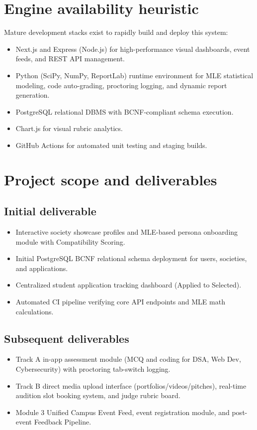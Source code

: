 \documentclass[11pt,a4paper]{article}
\begin{document}
\section{Engine availability heuristic}
Mature development stacks exist to rapidly build and deploy this system:
\begin{itemize}[leftmargin=0.7cm]
    \item Next.js and Express (Node.js) for high-performance visual dashboards, event feeds, and REST API management.
    \item Python (SciPy, NumPy, ReportLab) runtime environment for MLE statistical modeling, code auto-grading, proctoring logging, and dynamic report generation.
    \item PostgreSQL relational DBMS with BCNF-compliant schema execution.
    \item Chart.js for visual rubric analytics.
    \item GitHub Actions for automated unit testing and staging builds.
\end{itemize}

\section{Project scope and deliverables}
\subsection{Initial deliverable}
\begin{itemize}[leftmargin=0.7cm]
    \item Interactive society showcase profiles and MLE-based persona onboarding module with Compatibility Scoring.
    \item Initial PostgreSQL BCNF relational schema deployment for users, societies, and applications.
    \item Centralized student application tracking dashboard (Applied to Selected).
    \item Automated CI pipeline verifying core API endpoints and MLE math calculations.
\end{itemize}

\subsection{Subsequent deliverables}
\begin{itemize}[leftmargin=0.7cm]
    \item Track A in-app assessment module (MCQ and coding for DSA, Web Dev, Cybersecurity) with proctoring tab-switch logging.
    \item Track B direct media upload interface (portfolios/videos/pitches), real-time audition slot booking system, and judge rubric board.
    \item Module 3 Unified Campus Event Feed, event registration module, and post-event Feedback Pipeline.
\end{itemize}
\end{document}
